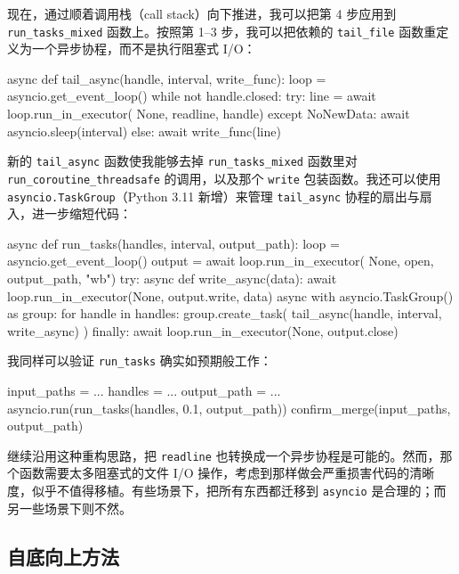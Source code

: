 现在，通过顺着调用栈（call stack）向下推进，我可以把第 4 步应用到 \texttt{run\_tasks\_mixed} 函数上。按照第 1–3 步，我可以把依赖的 \texttt{tail\_file} 函数重定义为一个异步协程，而不是执行阻塞式 I/O：

\begin{codebox}[python]
async def tail_async(handle, interval, write_func):
    loop = asyncio.get_event_loop()
    while not handle.closed:
        try:
             line = await loop.run_in_executor(
    None, readline, handle)
        except NoNewData:
            await asyncio.sleep(interval)
        else:
            await write_func(line)
\end{codebox}

新的 \texttt{tail\_async} 函数使我能够去掉 \texttt{run\_tasks\_mixed} 函数里对 \texttt{run\_coroutine\_threadsafe} 的调用，以及那个 \texttt{write} 包装函数。我还可以使用 \texttt{asyncio.TaskGroup}（Python 3.11 新增）来管理 \texttt{tail\_async} 协程的扇出与扇入，进一步缩短代码：

\begin{codebox}[python]
async def run_tasks(handles, interval, output_path):
    loop = asyncio.get_event_loop()
     output = await loop.run_in_executor(
    None, open, output_path, "wb")
    try:
        async def write_async(data):
            await loop.run_in_executor(None, output.write, data)
        async with asyncio.TaskGroup() as group:
            for handle in handles:
                group.create_task(
                    tail_async(handle, interval, write_async)
                )
    finally:
        await loop.run_in_executor(None, output.close)
\end{codebox}

我同样可以验证 \texttt{run\_tasks} 确实如预期般工作：

\begin{codebox}[python]
input_paths = ...
handles = ...
output_path = ...
asyncio.run(run_tasks(handles, 0.1, output_path))
confirm_merge(input_paths, output_path)
\end{codebox}

继续沿用这种重构思路，把 \texttt{readline} 也转换成一个异步协程是可能的。然而，那个函数需要太多阻塞式的文件 I/O 操作，考虑到那样做会严重损害代码的清晰度，似乎不值得移植。有些场景下，把所有东西都迁移到 \texttt{asyncio} 是合理的；而另一些场景下则不然。

\subsection{自底向上方法}

